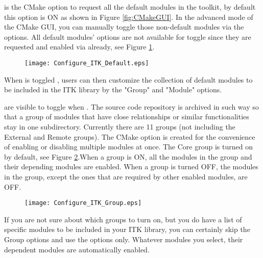  is the CMake option to request all the
default modules in the toolkit, by default this option is ON as shown in Figure
\ref{fig:CMakeGUI}.  In the advanced mode of the CMake GUI, you can manually
toggle those non-default modules via the 
options.   All default modules’  options are not
available  for toggle since they are requested and enabled via
 already, see Figure
\ref{fig:ConfigITKDefault}.

\begin{figure}[htb!]
\centering
\texttt{[image: Configure\_ITK\_Default.eps]}
\label{fig:ConfigITKDefault}
\end{figure}

When  is toggled , users can then
customize the collection of default modules to be included in the ITK library by
the "Group" and "Module" options.

 are visible to toggle when
. The source code repository is
archived  in  such way so that a group of modules that have close relationships
or similar functionalities stay in one subdirectory.  Currently there are 11
groups (not including the External and Remote groups).  The CMake
 option is created for the convenience of
enabling or disabling multiple modules at once. The Core group is turned on by
default, see Figure \ref{fig:ConfigITKGroup}.When a group is ON, all the modules in the group
and their depending modules are enabled. When a group is turned OFF, the
modules in the group, except the ones that are required by other enabled
modules, are OFF.

\begin{figure}[htb!]
\centering
\texttt{[image: Configure\_ITK\_Group.eps]}
\label{fig:ConfigITKGroup}
\end{figure}

If you are not sure about which groups to turn on, but you do have a list of
specific modules to be included in your ITK library, you can certainly skip the
Group options and use the  options only.
Whatever modules you select, their dependent modules are automatically enabled.

